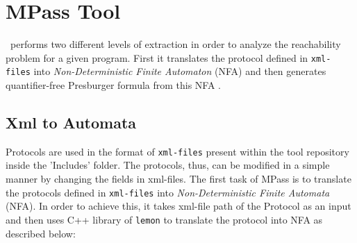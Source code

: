 \section{MPass Tool}\label{sec:logic}

\MPass\ performs two different levels of extraction in order to analyze the reachability 
problem for a given program. First it translates the protocol defined in {\tt xml-files} into 
\emph{Non-Deterministic Finite Automaton} (NFA) and then generates quantifier-free Presburger formula from this NFA .

%

\subsection{Xml to Automata}\label{subsec:copies}
Protocols are used in the format of {\tt xml-files} present within the tool repository inside the 'Includes' folder. The protocols, thus, can be modified in a simple manner by changing the fields in xml-files. The first task of MPass is to translate the protocols defined in {\tt xml-files} into 
\emph{Non-Deterministic Finite Automata} (NFA). In order to achieve this, it takes xml-file path of the Protocol 
as an input and then uses C++ library of {\tt lemon} to translate the protocol into NFA as described below:


